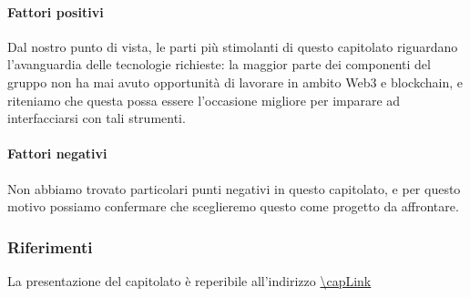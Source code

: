 \paragraph{Fattori positivi}

 Dal nostro punto di vista, le parti più stimolanti di questo capitolato riguardano l'avanguardia delle tecnologie richieste: la maggior parte dei componenti del gruppo non ha mai avuto opportunità di lavorare in ambito Web3 e blockchain, e riteniamo che questa possa essere l'occasione migliore per imparare ad interfacciarsi con tali strumenti.

\paragraph{Fattori negativi}

Non abbiamo trovato particolari punti negativi in questo capitolato, e per questo motivo possiamo confermare che sceglieremo questo come progetto da affrontare.
\subsubsection{Riferimenti}
La presentazione del capitolato è reperibile all'indirizzo \url{\capLink}